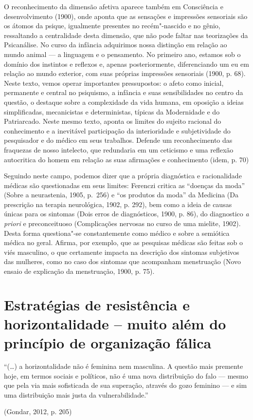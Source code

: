 O reconhecimento da dimensão afetiva aparece também em Consciência e
desenvolvimento (1900), onde aponta que as sensações e impressões
sensoriais são os átomos da psique, igualmente presentes no
recém"-nascido e no gênio, ressaltando a centralidade desta dimensão, que
não pode faltar nas teorizações da Psicanálise. No curso da infância
adquirimos nossa distinção em relação ao mundo animal --- a linguagem e o
pensamento. No primeiro ano, estamos sob o domínio dos instintos e
reflexos e, apenas posteriormente, diferenciando um eu em relação ao
mundo exterior, com suas próprias impressões sensoriais (1900, p. 68).
Neste texto, vemos operar importantes pressupostos: o afeto como
inicial, permanente e central no psiquismo, a infância e suas
sensibilidades no centro da questão, o destaque sobre a complexidade da
vida humana, em oposição a ideias simplificadas, mecanicistas e
deterministas, típicas da Modernidade e do Patriarcado. Neste mesmo
texto, aponta os limites do sujeito racional do conhecimento e a
inevitável participação da interioridade e subjetividade do pesquisador
e do médico em seus trabalhos. Defende um reconhecimento das fraquezas
de nosso intelecto, que redundaria em um ceticismo e uma reflexão
autocritica do homem em relação as suas afirmações e conhecimento (idem,
p. 70)

Seguindo neste campo, podemos dizer que a própria diagnóstica e
racionalidade médicas são questionadas em seus limites: Ferenczi critica
as ``doenças da moda'' (Sobre a neurastenia, 1905, p.~256) e ``os
produtos da moda'' da Medicina (Da prescrição na terapia neurológica,
1902, p. 292), bem como a ideia de causas únicas para os sintomas (Dois
erros de diagnósticos, 1900, p. 86), do diagnostico \emph{a priori} e
preconceituoso (Complicações nervosas no curso de uma mielite, 1902).
Desta forma questiona"-se constantemente como médico e sobre a semiótica
médica no geral. Afirma, por exemplo, que as pesquisas médicas são
feitas sob o viés masculino, o que certamente impacta na descrição dos
sintomas subjetivos das mulheres, como no caso dos sintomas que
acompanham menstruação (Novo ensaio de explicação da menstruação, 1900,
p. 75).

\section{Estratégias de resistência e horizontalidade -- muito além do
princípio de organização fálica }

\epigraph{``(\ldots{}) a horizontalidade não é feminina nem masculina.
A questão mais premente hoje, em termos sociais e políticos,
não é uma nova distribuição do falo --- mesmo que pela
via mais sofisticada de sua superação, através do gozo feminino
--- e sim uma distribuição mais justa da vulnerabilidade.''}{(Gondar, 2012, p. 205)}

